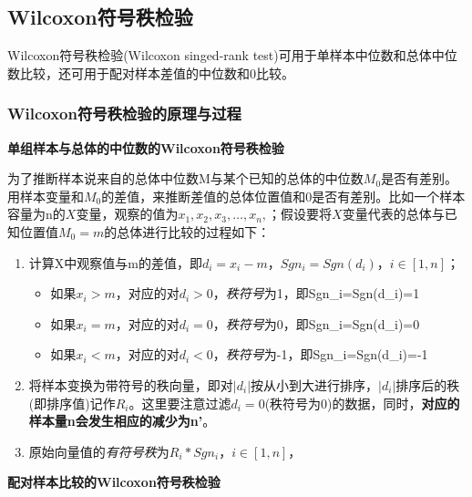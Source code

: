 \documentclass[
]{article}
\providecommand{\tightlist}{%
  \setlength{\itemsep}{0pt}\setlength{\parskip}{0pt}}
\begin{document}
\hypertarget{wilcoxonux7b26ux53f7ux79e9ux68c0ux9a8c}{%
\subsection{Wilcoxon符号秩检验}\label{wilcoxonux7b26ux53f7ux79e9ux68c0ux9a8c}}

Wilcoxon符号秩检验(Wilcoxon singed-rank test)可用于单样本中位数和总体中位数比较，还可用于配对样本差值的中位数和0比较。

\hypertarget{wilcoxonux7b26ux53f7ux79e9ux68c0ux9a8cux7684ux539fux7406ux4e0eux8fc7ux7a0b}{%
\subsubsection{Wilcoxon符号秩检验的原理与过程}\label{wilcoxonux7b26ux53f7ux79e9ux68c0ux9a8cux7684ux539fux7406ux4e0eux8fc7ux7a0b}}

\textbf{单组样本与总体的中位数的Wilcoxon符号秩检验}

为了推断样本说来自的总体中位数M与某个已知的总体的中位数\(M_0\)是否有差别。用样本变量和\(M_0\)的差值，来推断差值的总体位置值和0是否有差别。比如一个样本容量为n的\(X\)变量，观察的值为\(x_1,x_2,x_3,\dots,x_n,\)；假设要将\(X\)变量代表的总体与已知位置值\(M_0=m\)的总体进行比较的过程如下：

\begin{enumerate}
\def\labelenumi{\arabic{enumi}.}
\tightlist
\item
  计算X中观察值与m的差值，即\(d_i=x_i-m，Sgn_i=Sgn(d_i)，i\in[1,n]\)；

  \begin{itemize}
  \tightlist
  \item
    如果\(x_i>m\)，对应的对\(d_i>0\)，\emph{秩符号}为1，即Sgn\_i=Sgn(d\_i)=1
  \item
    如果\(x_i=m\)，对应的对\(d_i=0\)，\emph{秩符号}为0，即Sgn\_i=Sgn(d\_i)=0
  \item
    如果\(x_i<m\)，对应的对\(d_i<0\)，\emph{秩符号}为-1，即Sgn\_i=Sgn(d\_i)=-1
  \end{itemize}
\item
  将样本变换为带符号的秩向量，即对\(|d_i|\)按从小到大进行排序，\(|d_i|\)排序后的秩(即排序值)记作\(R_i\)。这里要注意过滤\(d_i=0\)(秩符号为0)的数据，同时，\textbf{对应的样本量n会发生相应的减少为n'}。
\item
  原始向量值的\emph{有符号秩}为\(R_i*Sgn_i，i\in[1,n]\)，
\end{enumerate}

\textbf{配对样本比较的Wilcoxon符号秩检验}
\end{document}

